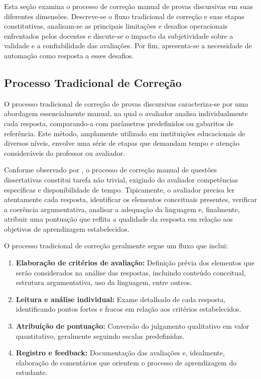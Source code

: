 Esta seção examina o processo de correção manual de provas discursivas em suas diferentes dimensões. Descreve-se o fluxo tradicional de correção e suas etapas constitutivas, analisam-se as principais limitações e desafios operacionais enfrentados pelos docentes e discute-se o impacto da subjetividade sobre a validade e a confiabilidade das avaliações. Por fim, apresenta-se a necessidade de automação como resposta a esses desafios.

\subsection{Processo Tradicional de Correção}

O processo tradicional de correção de provas discursivas caracteriza-se por uma abordagem essencialmente manual, na qual o avaliador analisa individualmente cada resposta, comparando-a com parâmetros predefinidos ou gabaritos de referência. Este método, amplamente utilizado em instituições educacionais de diversos níveis, envolve uma série de etapas que demandam tempo e atenção consideráveis do professor ou avaliador.

Conforme observado por \cite{lima_avaliacao_2023}, o processo de correção manual de questões dissertativas constitui tarefa não trivial, exigindo do avaliador competências específicas e disponibilidade de tempo. Tipicamente, o avaliador precisa ler atentamente cada resposta, identificar os elementos conceituais presentes, verificar a coerência argumentativa, analisar a adequação da linguagem e, finalmente, atribuir uma pontuação que reflita a qualidade da resposta em relação aos objetivos de aprendizagem estabelecidos.

O processo tradicional de correção geralmente segue um fluxo que inclui:
\begin{enumerate}
    \item \textbf{Elaboração de critérios de avaliação:} Definição prévia dos elementos que serão considerados na análise das respostas, incluindo conteúdo conceitual, estrutura argumentativa, uso da linguagem, entre outros.

    \item \textbf{Leitura e análise individual:} Exame detalhado de cada resposta, identificando pontos fortes e fracos em relação aos critérios estabelecidos.

    \item \textbf{Atribuição de pontuação:} Conversão do julgamento qualitativo em valor quantitativo, geralmente seguindo escalas predefinidas.

    \item \textbf{Registro e feedback:} Documentação das avaliações e, idealmente, elaboração de comentários que orientem o processo de aprendizagem do estudante.

\end{enumerate}

